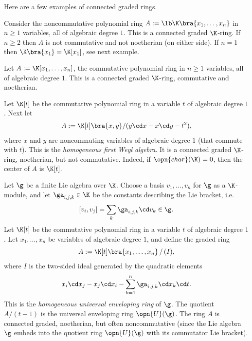 Here are a few examples of connected graded rings. 

\begin{exa} \label{exa:3755}
Consider the noncommutative polynomial ring 
$A := \lb \K \bra{x_1, \ldots, x_n}$ 
in $n \geq 1$ variables, all of algebraic degree $1$. This is a connected 
graded $\K$-ring. If $n \geq 2$ then $A$ is not commutative and not noetherian 
(on either side). If $n = 1$ then 
$\K \bra{x_1} = \K[x_1]$, see next example. 
\end{exa}

\begin{exa} \label{exa:3757} 
Let
$A := \K [x_1, \ldots, x_n]$,
the commutative polynomial ring 
in $n \geq 1$ variables, all of algebraic degree $1$. This is a connected 
graded $\K$-ring, commutative and noetherian.  
\end{exa}

\begin{exa} \label{exa:3756} 
Let $\K[t]$ be the commutative polynomial ring in a variable $t$ of algebraic 
degree $1$. Next let 
\[ A := \K[t] \bra{x, y} / (y \cd x - x \cd y - t^2) , \]
where $x$ and $y$ are noncommuting variables of algebraic 
degree $1$ (that commute with $t$). This is the {\em homogeneous first Weyl 
algebra}. It is a connected graded $\K$-ring, noetherian, but not commutative. 
Indeed, if $\opn{char}(\K) = 0$, then the center of $A$ is $\K[t]$. 
\end{exa}

\begin{exa} \label{exa:4075} 
Let $\g$ be a finite Lie algebra over $\K$. Choose a basis 
$v_1, \ldots, v_n$ for $\g$ as a $\K$-module, and let 
$\ga_{i, j, k} \in \K$ be the constants describing the Lie bracket, i.e.\
\[ [v_i, v_j] = \sum_k \ga_{i, j, k} \cd v_k \in \g . \]
Let $\K[t]$ be the commutative polynomial ring in a variable $t$ of algebraic 
degree $1$. Let $x_1, \ldots, x_n$ be variables of algebraic degree $1$, and 
define the graded ring 
\[ A := \K[t] \bra{x_1, \ldots, x_n} \, / \, (I) , \]
where $I$ is the two-sided ideal generated by the quadratic elements 
\[ x_i \cd x_j - x_j \cd x_i  - \sum_{k = 1}^n \ga_{i, j, k} \cd x_k \cd t . \]
This is the {\em homogeneous universal enveloping ring} of $\g$. 
The quotient $A / (t - 1)$ is the  universal enveloping ring
$\opn{U}(\g)$. The ring $A$ is connected graded, noetherian, but often 
noncommutative (since the Lie algebra $\g$ embeds into the quotient ring 
$\opn{U}(\g)$ with its commutator Lie bracket). 
\end{exa}

